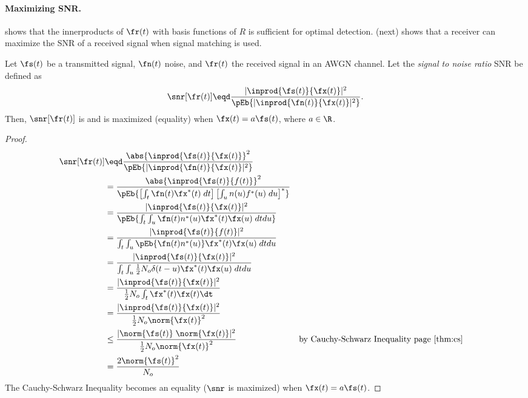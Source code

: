 \paragraph{Maximizing SNR.}
 shows that the innerproducts of $\fr(t)$ with 
basis functions of $R$ is sufficient for optimal detection.
 (next) shows that a receiver can 
maximize the SNR of a received signal when signal matching is used.

\begin{theorem}
\label{thm:mf_maxSNR}
Let $\fs(t)$ be a transmitted signal, $\fn(t)$ noise, and $\fr(t)$ the received signal
in an AWGN channel.
Let the {\em signal to noise ratio} SNR be defined as 
   \[ \snr[\fr(t)] \eqd \frac{|\inprod{\fs(t)}{\fx(t)}|^2}
                            {\pEb{|\inprod{\fn(t)}{\fx(t)}|^2}}. \]
Then, $\snr[\fr(t)]$ is 
and is maximized (equality) when $\fx(t)=a\fs(t)$, where $a\in\R$.
\end{theorem}

\begin{proof}
\begin{align*}
   \snr[\fr(t)]
     &\eqd \frac{\abs{\inprod{\fs(t)}{\fx(t)}}^2}
                {\pEb{|\inprod{\fn(t)}{\fx(t)}|^2}}
   \\&=    \frac{\abs{\inprod{\fs(t)}{f(t)}}^2}
                {\pEb{\left[\int_t \fn(t)\fx^\ast(t)\;dt\right] 
                      \left[\int_u n(u)f^\ast(u)\;du\right]^\ast}
                }
   \\&=    \frac{|\inprod{\fs(t)}{\fx(t)}|^2}
                {\pEb{\int_t \int_u \fn(t)n^\ast(u)\fx^\ast(t)\fx(u)\;dtdu}}
   \\&=    \frac{|\inprod{\fs(t)}{f(t)}|^2}
                {\int_t \int_u \pEb{\fn(t)n^\ast(u)}\fx^\ast(t)\fx(u)\;dtdu}
   \\&=    \frac{|\inprod{\fs(t)}{\fx(t)}|^2}
                {\int_t \int_u \frac{1}{2}N_o\delta(t-u) \fx^\ast(t)\fx(u)\;dtdu}
   \\&=    \frac{|\inprod{\fs(t)}{\fx(t)}|^2}
                {\frac{1}{2}N_o \int_t \fx^\ast(t)\fx(t)\dt}
   \\&=    \frac{|\inprod{\fs(t)}{\fx(t)}|^2}
                {\frac{1}{2}N_o \norm{\fx(t)}^2}
   \\&\le  \frac{|\norm{\fs(t)}\;\norm{\fx(t)}|^2}
                {\frac{1}{2}N_o \norm{\fx(t)}^2}
     &&    \text{by Cauchy-Schwarz Inequality page~\pageref{thm:cs}}
   \\&=    \frac{2\norm{\fs(t)}^2}
                {N_o }
\end{align*}
The Cauchy-Schwarz Inequality becomes an equality 
($\snr$ is maximized) when $\fx(t)=a\fs(t)$.
\end{proof}

